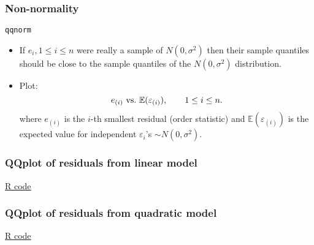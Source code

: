 \documentclass[handout]{beamer}
\newcommand{\Ee}{\mathbb{E}}
\begin{document}

   \begin{frame} \frametitle{Non-normality}

   \begin{block}
   {{\tt qqnorm}}
   \begin{itemize}
   \item If $e_i, 1\leq i \leq n$ were really a sample of
   $N(0, \sigma^2)$ then their sample quantiles should be close to the
   sample quantiles of the $N(0, \sigma^2)$ distribution.

   \item Plot:
   $$
   e_{(i)}  \ {\rm vs.} \  \Ee(\varepsilon_{(i)}), \qquad 1 \leq i \leq n.$$
   where $e_{(i)}$ is the $i$-th smallest residual (order statistic) and
   $\Ee(\varepsilon_{(i)})$ is the expected value for independent $\varepsilon_i$'s $\sim N(0,\sigma^2)$.
   \end{itemize}
   \end{block}
   \end{frame}



   \begin{frame}
   \frametitle{QQplot of residuals from linear model}
   \begin{center}
   \end{center}
   \href{http://stats191.stanford.edu/simple_diagnostics.html#poorly-fitting-linear-model}{R code}
   \end{frame}



   \begin{frame}
   \frametitle{QQplot of residuals from quadratic model}
   \begin{center}
   \end{center}
   \href{http://stats191.stanford.edu/simple_diagnostics.html#poorly-fitting-linear-model}{R code}
   \end{frame}

\end{document}
